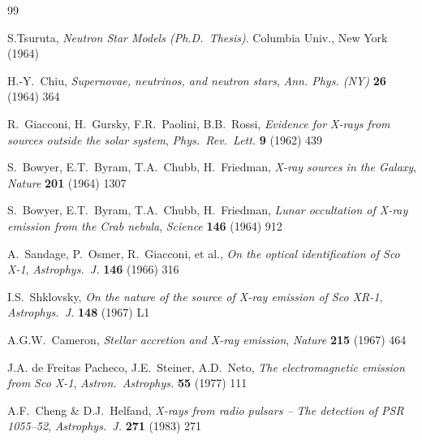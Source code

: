 \documentclass{pos1}
\begin{document}
\begin{thebibliography}{99}
\itemsep=4pt
\newcommand{\artref}[4]{\textit{#1} \textbf{#2} (#4) #3}
\newcommand{\AandA}[3]{\artref{Astron.\ Astrophys.}{#1}{#2}{#3}}
\newcommand{\ApJ}[3]{\artref{Astrophys.\ J.}{#1}{#2}{#3}}
\newcommand{\ApJS}[3]{\artref{Astrophys.\ J.\ Suppl.\ Ser.}{#1}{#2}{#3}}
\newcommand{\ApSS}[3]{\artref{Astrophys.\ Space Sci.}{#1}{#2}{#3}}
\newcommand{\AL}[3]{\artref{Astron.\ Lett.}{#1}{#2}{#3}}
\newcommand{\SvA}[3]{\artref{Sov.\ Astron.}{#1}{#2}{#3}}
\newcommand{\MNRAS}[3]{\artref{Mon.\ Not.\ R.\ Astron.\ Soc.}{#1}{#2}{#3}}
\newcommand{\PR}[4]{\artref{Phys.\ Rev. #1}{#2}{#3}{#4}}
\newcommand{\PRL}[3]{\artref{Phys.\ Rev.\ Lett.}{#1}{#2}{#3}}

S.Tsuruta,
\textit{Neutron Star Models
(Ph.D.\ Thesis)}. Columbia Univ., New York (1964)

H.-Y.~Chiu,
\textit{Supernovae, neutrinos, and neutron stars},
\artref{Ann. Phys. (NY)}{26}{364}{1964}

R.~Giacconi, H.~Gursky, F.R.~Paolini, B.B.~Rossi,
\textit{Evidence for X-rays from sources outside the solar system},
\PRL{9}{439}{1962}

S.~Bowyer, E.T.~Byram, T.A.~Chubb, H.~Friedman,
\textit{X-ray sources in the Galaxy},
\artref{Nature}{201}{1307}{1964}

S.~Bowyer, E.T.~Byram, T.A.~Chubb, H.~Friedman,
\textit{Lunar occultation of X-ray emission from the Crab nebula},
\artref{Science}{146}{912}{1964}

A.~Sandage, P.~Osmer, R.~Giacconi, et al.,
\textit{On the optical identification of Sco X-1},
\ApJ{146}{316}{1966}

I.S.~Shklovsky,
\textit{On the nature of the source of X-ray emission of Sco XR-1},
\ApJ{148}{L1}{1967}

A.G.W.~Cameron,
\textit{Stellar accretion and X-ray emission},
\artref{Nature}{215}{464}{1967}

J.A. de Freitas Pacheco, J.E.~Steiner, A.D.~Neto,
\textit{The electromagnetic emission from Sco X-1},
\AandA{55}{111}{1977}

A.F.~Cheng \& D.J.~Helfand,
\textit{X-rays from radio pulsars -- The detection of PSR 1055--52},
\ApJ{271}{271}{1983}


\end{thebibliography}
\end{document}
